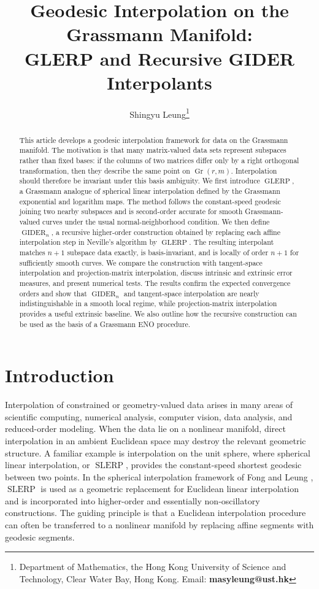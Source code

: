 \documentclass[a4paper,11pt]{article}
\title{Geodesic Interpolation on the Grassmann Manifold:\\ GLERP and Recursive GIDER Interpolants}
\author{
Shingyu Leung\thanks{Department of Mathematics, the Hong Kong University of Science and Technology, Clear Water Bay, Hong Kong. Email: {\bf masyleung@ust.hk}}
}
\date{}
\newcommand{\SLERP}{\operatorname{SLERP}}
\DeclareMathOperator{\Gr}{Gr}
\newcommand{\GLERP}{\operatorname{GLERP}}
\newcommand{\GIDER}{\operatorname{GIDER}}
\numberwithin{equation}{section}
\theoremstyle{plain}
\theoremstyle{definition}
\theoremstyle{remark}
\begin{document}
\maketitle

\begin{abstract}
This article develops a geodesic interpolation framework for data on the Grassmann manifold.  The motivation is that many matrix-valued data sets represent subspaces rather than fixed bases: if the columns of two matrices differ only by a right orthogonal transformation, then they describe the same point on \(\Gr(r,m)\).  Interpolation should therefore be invariant under this basis ambiguity.  We first introduce \(\GLERP\), a Grassmann analogue of spherical linear interpolation defined by the Grassmann exponential and logarithm maps.  The method follows the constant-speed geodesic joining two nearby subspaces and is second-order accurate for smooth Grassmann-valued curves under the usual normal-neighborhood condition.  We then define \(\GIDER_n\), a recursive higher-order construction obtained by replacing each affine interpolation step in Neville's algorithm by \(\GLERP\).  The resulting interpolant matches \(n+1\) subspace data exactly, is basis-invariant, and is locally of order \(n+1\) for sufficiently smooth curves.  We compare the construction with tangent-space interpolation and projection-matrix interpolation, discuss intrinsic and extrinsic error measures, and present numerical tests.  The results confirm the expected convergence orders and show that \(\GIDER_n\) and tangent-space interpolation are nearly indistinguishable in a smooth local regime, while projection-matrix interpolation provides a useful extrinsic baseline.  We also outline how the recursive construction can be used as the basis of a Grassmann ENO procedure.
\end{abstract}


\section{Introduction}

Interpolation of constrained or geometry-valued data arises in many areas of scientific computing, numerical analysis, computer vision, data analysis, and reduced-order modeling.  When the data lie on a nonlinear manifold, direct interpolation in an ambient Euclidean space may destroy the relevant geometric structure.  A familiar example is interpolation on the unit sphere, where spherical linear interpolation, or \(\SLERP\), provides the constant-speed shortest geodesic between two points.  In the spherical interpolation framework of Fong and Leung \cite{FongLeung2023}, \(\SLERP\) is used as a geometric replacement for Euclidean linear interpolation and is incorporated into higher-order and essentially non-oscillatory constructions.  The guiding principle is that a Euclidean interpolation procedure can often be transferred to a nonlinear manifold by replacing affine segments with geodesic segments.
\end{document}
